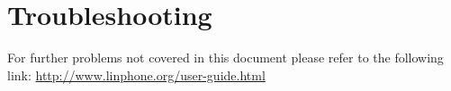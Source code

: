 \documentclass[11pt]{article}
\begin{document}


\section{Troubleshooting}

For further problems not covered in this document please refer to the following link:
\url{http://www.linphone.org/user-guide.html}
\end{document}
